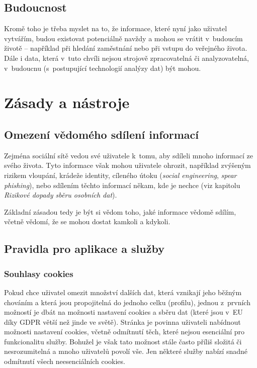 \subsection{Budoucnost}
Kromě toho je třeba myslet na to, že informace, které nyní jako uživatel vytvářím, budou existovat potenciálně navždy a mohou se vrátit v~budoucím životě -- například při hledání zaměstnání nebo při vstupu do veřejného života. 
Dále i data, která v~tuto chvíli nejsou strojově zpracovatelná či analyzovatelná, v~budoucnu (s~postupující technologií analýzy dat) být mohou.


\section{Zásady a nástroje}

\subsection{Omezení vědomého sdílení informací}
Zejména sociální sítě vedou své uživatele k~tomu, aby sdíleli mnoho informací ze svého života. Tyto informace však mohou uživatele ohrozit, například zvýšeným rizikem vloupání, krádeže identity, cíleného útoku (\textit{social engineering}, \textit{spear phishing}), nebo sdílením těchto informací někam, kde je nechce (viz kapitolu \textit{Rizikové dopady sběru osobních dat}).

Základní zásadou tedy je být si vědom toho, jaké informace vědomě sdílím, včetně vědomí, že se mohou dostat kamkoli a kdykoli.

\subsection{Pravidla pro aplikace a služby}
\subsubsection*{Souhlasy cookies}

Pokud chce uživatel omezit množství dalších dat, která vznikají jeho běžným chováním a která jsou propojitelná do jednoho celku (profilu), jednou z~prvních možností je dbát na možnosti nastavení cookies a sběru dat (které jsou v~EU díky GDPR větší než jinde ve světě). Stránka je povinna uživateli nabídnout možnosti nastavení cookies, včetně odmítnutí těch, které nejsou esenciální pro funkcionalitu služby.
Bohužel je však tato možnost stále často příliš složitá či nesrozumitelná a mnoho uživatelů povolí vše. Jen některé služby nabízí snadné odmítnutí všech neesenciálních cookies.\\

